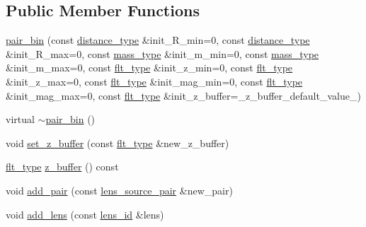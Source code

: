 \subsection*{Public Member Functions}
\begin{DoxyCompactItemize}
\item 
\hyperlink{classIceBRG_1_1pair__bin_ab951efb7c961a3910cd30e4eab58fbbf}{pair\+\_\+bin} (const \hyperlink{namespaceIceBRG_a45499647eb87e24c10ab32c628711cec}{distance\+\_\+type} \&init\+\_\+\+R\+\_\+min=0, const \hyperlink{namespaceIceBRG_a45499647eb87e24c10ab32c628711cec}{distance\+\_\+type} \&init\+\_\+\+R\+\_\+max=0, const \hyperlink{namespaceIceBRG_a1be72ac4918a9b029f2eefa084213e35}{mass\+\_\+type} \&init\+\_\+m\+\_\+min=0, const \hyperlink{namespaceIceBRG_a1be72ac4918a9b029f2eefa084213e35}{mass\+\_\+type} \&init\+\_\+m\+\_\+max=0, const \hyperlink{lib_2IceBRG__main_2common_8h_ad0f130a56eeb944d9ef2692ee881ecc4}{flt\+\_\+type} \&init\+\_\+z\+\_\+min=0, const \hyperlink{lib_2IceBRG__main_2common_8h_ad0f130a56eeb944d9ef2692ee881ecc4}{flt\+\_\+type} \&init\+\_\+z\+\_\+max=0, const \hyperlink{lib_2IceBRG__main_2common_8h_ad0f130a56eeb944d9ef2692ee881ecc4}{flt\+\_\+type} \&init\+\_\+mag\+\_\+min=0, const \hyperlink{lib_2IceBRG__main_2common_8h_ad0f130a56eeb944d9ef2692ee881ecc4}{flt\+\_\+type} \&init\+\_\+mag\+\_\+max=0, const \hyperlink{lib_2IceBRG__main_2common_8h_ad0f130a56eeb944d9ef2692ee881ecc4}{flt\+\_\+type} \&init\+\_\+z\+\_\+buffer=\+\_\+z\+\_\+buffer\+\_\+default\+\_\+value\+\_\+)
\item 
virtual \hyperlink{classIceBRG_1_1pair__bin_a66e756e18910966d7455a3bf35e39b7d}{$\sim$pair\+\_\+bin} ()
\item 
void \hyperlink{classIceBRG_1_1pair__bin_a679b3e87b4414c9ef2f2192e46ca5dbe}{set\+\_\+z\+\_\+buffer} (const \hyperlink{lib_2IceBRG__main_2common_8h_ad0f130a56eeb944d9ef2692ee881ecc4}{flt\+\_\+type} \&new\+\_\+z\+\_\+buffer)
\item 
\hyperlink{lib_2IceBRG__main_2common_8h_ad0f130a56eeb944d9ef2692ee881ecc4}{flt\+\_\+type} \hyperlink{classIceBRG_1_1pair__bin_a3712b1f0714d9c7dbd4e3f8bb5f92bdd}{z\+\_\+buffer} () const 
\item 
void \hyperlink{classIceBRG_1_1pair__bin_a2e97e0e531f74f95285029f40af20f04}{add\+\_\+pair} (const \hyperlink{classIceBRG_1_1lens__source__pair}{lens\+\_\+source\+\_\+pair} \&new\+\_\+pair)
\item 
void \hyperlink{classIceBRG_1_1pair__bin_a64e16e56545c85dd67180c9205c554eb}{add\+\_\+lens} (const \hyperlink{structIceBRG_1_1lens__id}{lens\+\_\+id} \&lens)

\end{DoxyCompactItemize}

